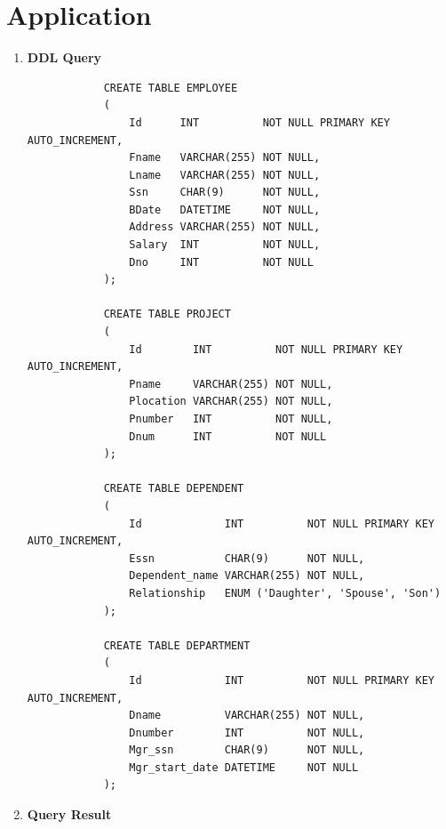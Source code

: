 \documentclass[12pt,titlepage]{article}
\begin{document}
\section{Application}
\begin{enumerate}[label=\Alph*.]
    \item {
        \large{\textbf{DDL Query}}

        \begin{verbatim}
            CREATE TABLE EMPLOYEE
            (
                Id      INT          NOT NULL PRIMARY KEY AUTO_INCREMENT,
                Fname   VARCHAR(255) NOT NULL,
                Lname   VARCHAR(255) NOT NULL,
                Ssn     CHAR(9)      NOT NULL,
                BDate   DATETIME     NOT NULL,
                Address VARCHAR(255) NOT NULL,
                Salary  INT          NOT NULL,
                Dno     INT          NOT NULL
            );

            CREATE TABLE PROJECT
            (
                Id        INT          NOT NULL PRIMARY KEY AUTO_INCREMENT,
                Pname     VARCHAR(255) NOT NULL,
                Plocation VARCHAR(255) NOT NULL,
                Pnumber   INT          NOT NULL,
                Dnum      INT          NOT NULL
            );

            CREATE TABLE DEPENDENT
            (
                Id             INT          NOT NULL PRIMARY KEY AUTO_INCREMENT,
                Essn           CHAR(9)      NOT NULL,
                Dependent_name VARCHAR(255) NOT NULL,
                Relationship   ENUM ('Daughter', 'Spouse', 'Son')
            );

            CREATE TABLE DEPARTMENT
            (
                Id             INT          NOT NULL PRIMARY KEY AUTO_INCREMENT,
                Dname          VARCHAR(255) NOT NULL,
                Dnumber        INT          NOT NULL,
                Mgr_ssn        CHAR(9)      NOT NULL,
                Mgr_start_date DATETIME     NOT NULL
            );
        \end{verbatim}
    }
    \pagebreak
    \item {
        \large{\textbf{Query Result}}
        
}
\end{enumerate}
\end{document}

